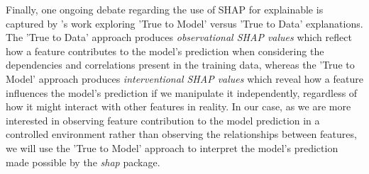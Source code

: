 Finally, one ongoing debate regarding the use of SHAP for explainable is captured by \citet{chenTrueModelTrue2020}'s work exploring 'True to Model' versus 'True to Data' explanations. The 'True to Data' approach produces \textit{observational SHAP values} which reflect how a feature contributes to the model's prediction when considering the dependencies and correlations present in the training data, whereas the 'True to Model' approach produces \textit{interventional SHAP values} which reveal how a feature influences the model's prediction if we manipulate it independently, regardless of how it might interact with other features in reality. In our case, as we are more interested in observing feature contribution to the model prediction in a controlled environment rather than observing the relationships between features, we will use the 'True to Model' approach to interpret the model's prediction made possible by the \textit{shap} package.